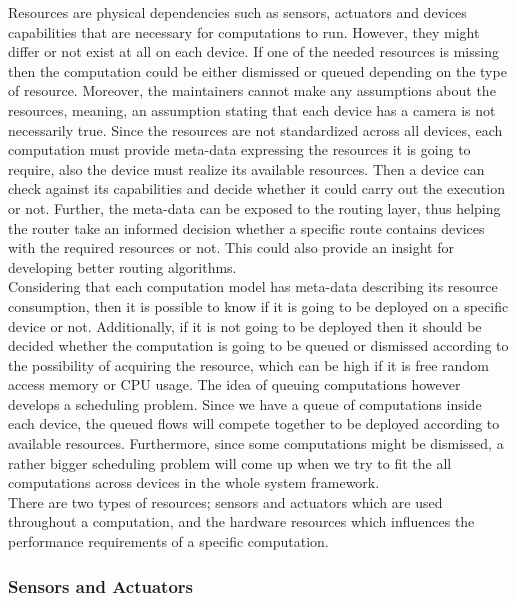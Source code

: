 Resources are physical dependencies such as sensors, actuators and devices capabilities that are necessary for computations to run. However, they might differ or not exist at all on each device. If one of the needed resources is missing then the computation could be either dismissed or queued depending on the type of resource. Moreover, the maintainers cannot make any assumptions about the resources, meaning, an assumption stating that each device has a camera is not necessarily true. Since the resources are not standardized across all devices, each computation must provide meta-data expressing the resources it is going to require, also the device must realize its available resources. Then a device can check against its capabilities and decide whether it could carry out the execution or not. Further, the meta-data can be exposed to the routing layer, thus helping the router take an informed decision whether a specific route contains devices with the required resources or not. This could also provide an insight for developing better routing algorithms.\\

 \noindent Considering that each computation model has meta-data describing its resource consumption, then it is possible to know if it is going to be deployed on a specific device or not. Additionally, if it is not going to be deployed then it should be decided whether the computation is going to be queued or dismissed according to the possibility of acquiring the resource, which can be high if it is free random access memory or CPU usage. The idea of queuing computations however develops a scheduling problem. Since we have a queue of computations inside each device, the queued flows will compete together to be deployed according to available resources. Furthermore, since some computations might be dismissed, a rather bigger scheduling problem will come up when we try to fit the all computations across devices in the whole system framework.\\

  \noindent There are two types of resources; sensors and actuators which are used throughout a computation, and the hardware resources which influences the performance requirements of a specific computation.


\subsubsection{Sensors and Actuators} \label{subsec:sensors-and-actuators}

